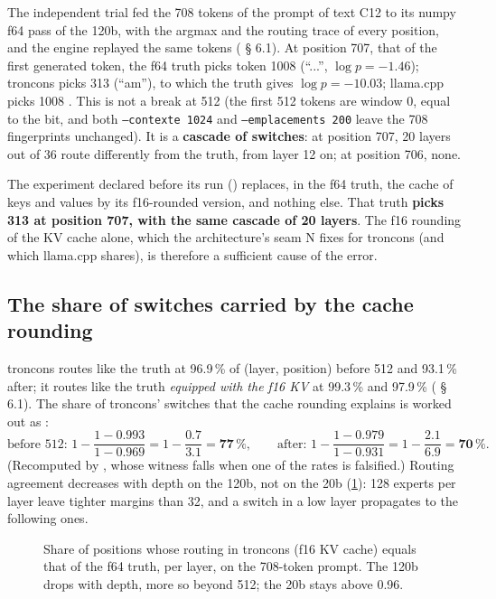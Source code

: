 The independent trial fed the 708 tokens of the prompt of text C12 to its numpy f64 pass of the 120b, with the argmax and the routing trace of every position, and the engine replayed the same tokens ( § 6.1). At position 707, that of the first generated token, the f64 truth picks token 1008 (\enquote{...}, $\log p = -1.46$); troncons picks 313 (\enquote{am}), to which the truth gives $\log p = -10.03$; llama.cpp picks 1008 \mes. This is not a break at 512 (the first 512 tokens are window 0, equal to the bit, and both \texttt{--contexte 1024} and \texttt{--emplacements 200} leave the 708 fingerprints unchanged). It is a \textbf{cascade of switches}: at position 707, 20 layers out of 36 route differently from the truth, from layer 12 on; at position 706, none.

The experiment declared before its run () replaces, in the f64 truth, the cache of keys and values by its f16-rounded version, and nothing else. That truth \textbf{picks 313 at position 707, with the same cascade of 20 layers}. The f16 rounding of the KV cache alone, which the architecture's seam N fixes for troncons (and which llama.cpp shares), is therefore a sufficient cause of the error.

\subsection{The share of switches carried by the cache rounding}\label{sec:t2r-part}

troncons routes like the truth at 96.9\,\% of (layer, position) before 512 and 93.1\,\% after; it routes like the truth \emph{equipped with the f16 KV} at 99.3\,\% and 97.9\,\% ( § 6.1). The share of troncons' switches that the cache rounding explains is worked out as \calc:
\[
\text{before 512: } 1 - \frac{1 - 0.993}{1 - 0.969} = 1 - \frac{0.7}{3.1} = \mathbf{77\,\%}, \qquad
\text{after: } 1 - \frac{1 - 0.979}{1 - 0.931} = 1 - \frac{2.1}{6.9} = \mathbf{70\,\%}.
\]
(Recomputed by , whose witness falls when one of the rates is falsified.) Routing agreement decreases with depth on the 120b, not on the 20b (\cref{fig:t2r-routage}): 128 experts per layer leave tighter margins than 32, and a switch in a low layer propagates to the following ones.

\begin{figure}[ht]
\centering
\GrapheRefRoutage
\caption[Routing agreement per layer, engine against truth]{Share of positions whose routing in troncons (f16 KV cache) equals that of the f64 truth, per layer, on the 708-token prompt. The 120b drops with depth, more so beyond 512; the 20b stays above 0.96.}
\label{fig:t2r-routage}
\end{figure}

